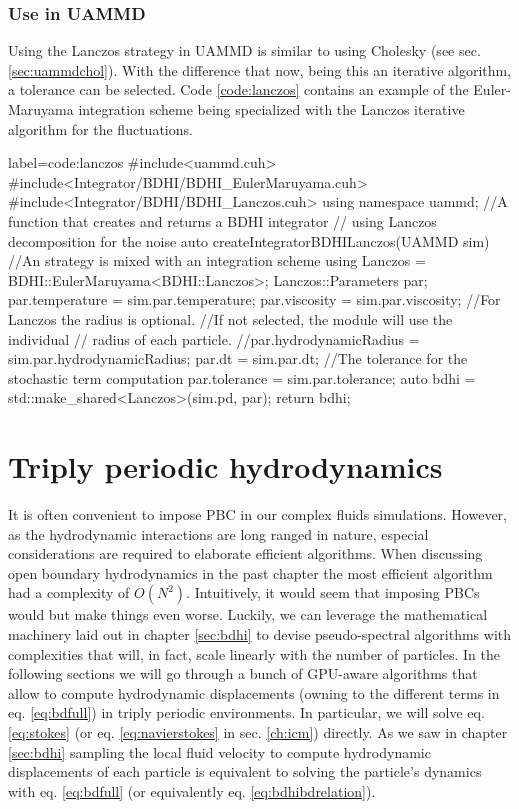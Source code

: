 \documentclass[ twoside,openright,titlepage,numbers=noenddot,%
headinclude,footinclude,cleardoublepage=empty,abstract=on,
BCOR=5mm,paper=a4,fontsize=11pt, dvipsnames
]{scrreprt}
\newcommand{\uammd}{\gls{UAMMD}\xspace}
\begin{document}
\subsection*{Use in UAMMD}
Using the Lanczos strategy in \uammd is similar to using Cholesky (see sec. \ref{sec:uammdchol}). With the difference that now, being this an iterative algorithm, a tolerance can be selected.
Code \ref{code:lanczos} contains an example of the Euler-Maruyama integration scheme being specialized with the Lanczos iterative algorithm for the fluctuations.
\begin{code2}    {label=code:lanczos}
#include<uammd.cuh>
#include<Integrator/BDHI/BDHI_EulerMaruyama.cuh>
#include<Integrator/BDHI/BDHI_Lanczos.cuh>
using namespace uammd;
//A function that creates and returns a BDHI integrator
// using Lanczos decomposition for the noise
auto createIntegratorBDHILanczos(UAMMD sim){   
  //An strategy is mixed with an integration scheme
  using Lanczos = BDHI::EulerMaruyama<BDHI::Lanczos>;
  Lanczos::Parameters par;
  par.temperature = sim.par.temperature;
  par.viscosity = sim.par.viscosity;
  //For Lanczos the radius is optional.
  //If not selected, the module will use the individual 
  //  radius of each particle.
  //par.hydrodynamicRadius = sim.par.hydrodynamicRadius;
  par.dt = sim.par.dt;
  //The tolerance for the stochastic term computation
  par.tolerance = sim.par.tolerance;
  auto bdhi = std::make_shared<Lanczos>(sim.pd, par);
  return bdhi;
}
\end{code2}

\newpage
\chapter{Triply periodic hydrodynamics}
It is often convenient to impose \gls{PBC} in our complex fluids simulations. However, as the hydrodynamic interactions are long ranged in nature, especial considerations are required to elaborate efficient algorithms. When discussing open boundary hydrodynamics in the past chapter the most efficient algorithm had a complexity of $O(N^2)$. Intuitively, it would seem that imposing \glspl{PBC} would but make things even worse. Luckily, we can leverage the mathematical machinery laid out in chapter \ref{sec:bdhi} to devise pseudo-spectral algorithms with complexities that will, in fact, scale linearly with the number of particles. In the following sections we will go through a bunch of GPU-aware algorithms that allow to compute hydrodynamic displacements (owning to the different terms in eq. \eqref{eq:bdfull}) in triply periodic environments. In particular, we will solve eq. \eqref{eq:stokes} (or eq. \eqref{eq:navierstokes} in sec. \ref{ch:icm}) directly. As we saw in chapter \ref{sec:bdhi} sampling the local fluid velocity to compute hydrodynamic displacements of each particle is equivalent to solving the particle's dynamics with eq. \eqref{eq:bdfull} (or equivalently eq. \eqref{eq:bdhibdrelation}).
\end{document}
